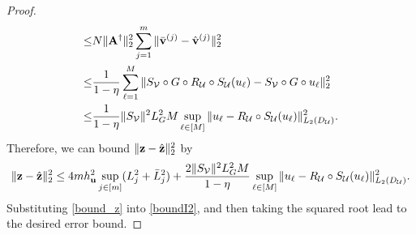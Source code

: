 \documentclass[10pt,a4paper]{amsart}
\newcommand{\Ab}{\mathbf{A}}
\newcommand{\Uc}{\mathcal{U}}
\newcommand{\Vc}{\mathcal{V}}
\newcommand{\ub}{\mathbf{u}}
\newcommand{\vb}{\mathbf{v}}
\newcommand{\zb}{\mathbf{z}}
\begin{document}
\begin{proof}
\begin{equation*}
\begin{aligned}
\leq & N\|\Ab^\dagger\|_2^2 \sum_{j=1}^m \| \Bar{\vb}^{(j)} - \Hat{\vb}^{(j)}\|^2_2 \\
\leq & \frac{1}{1-\eta} \sum_{\ell=1}^M \|S_\Vc\circ G \circ R_\Uc \circ S_\Uc(u_\ell) -   S_\Vc\circ G \circ u_\ell\|^2_2 \\
\leq & \frac{1}{1-\eta} \|S_\Vc\|^2 L_G^2 M \sup_{\ell\in[M]}\| u_\ell - R_\Uc\circ S_\Uc(u_\ell)\|^2_{L_2(D_\Uc)}.
\end{aligned}
\end{equation*}
Therefore, we can bound $\|\zb-\Hat{\zb}\|_2^2$ by
\begin{equation}
\label{bound_z}
\| \zb - \Hat{\zb} \|_2^2 \leq 4mh_\ub^2\sup_{j\in[m]}(L_j^2+\Bar{L}_j^2) + \frac{2\|S_\Vc\|^2 L^2_G M}{1-\eta} \sup_{\ell\in[M]}\| u_\ell - R_\Uc\circ S_\Uc(u_\ell)\|^2_{L_2(D_\Uc)}.
\end{equation}
Substituting \eqref{bound_z} into \eqref{boundI2}, and then taking the squared root lead to the desired error bound.
\end{proof}
\end{document}
